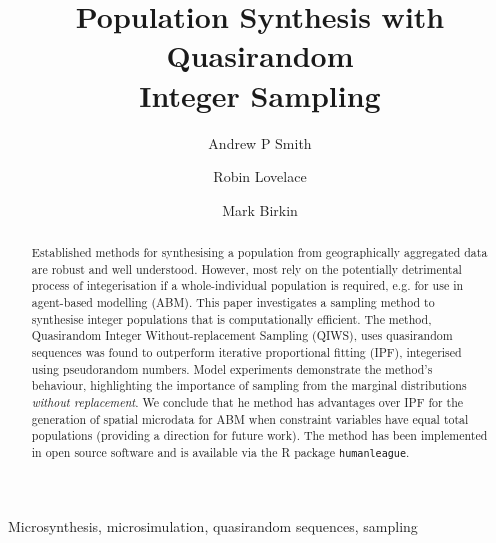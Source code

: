 \documentclass{JASSS}
\title{Population Synthesis with Quasirandom \\Integer Sampling}
\author[1]{Andrew P Smith}
\author[1]{Robin Lovelace}
\author[1]{Mark Birkin}
\affil[1]{University of Leeds}
\begin{document}
\maketitle 



\begin{abstract}
Established methods for synthesising a population from geographically
aggregated data are robust and well understood. However, most rely on
the potentially detrimental process of integerisation if a
whole-individual population is required, e.g. for use in agent-based
modelling (ABM). This paper investigates a sampling method to synthesise
integer populations that is computationally efficient.
The method, Quasirandom Integer Without-replacement Sampling (QIWS),
uses quasirandom sequences was found to outperform iterative proportional
fitting (IPF), integerised
using pseudorandom numbers. Model experiments demonstrate the method's
behaviour, highlighting the importance of sampling from
 the marginal distributions \emph{without replacement}.
We conclude that he method has advantages over IPF 
for the generation of spatial microdata for ABM when constraint
variables have equal total populations (providing a direction for future work).
The method has been implemented in open source software and is available via
the R package \texttt{humanleague}.
\end{abstract}

\begin{keywords}
Microsynthesis, microsimulation, quasirandom sequences, sampling
\end{keywords}

\parano{}



\end{document}
